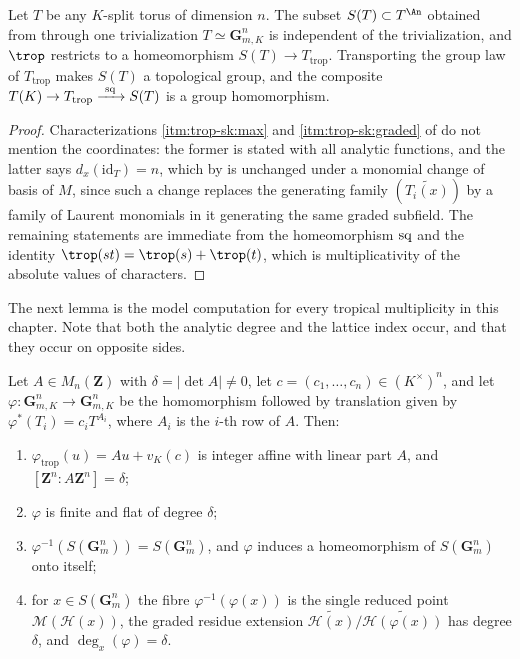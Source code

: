 \begin{corollary}
\label{cor:trop-skeleton-intrinsic}
Let $T$ be any $K$-split torus of dimension $n$. The subset
$S(T)\subset T^{\An}$ obtained from  through
one trivialization $T\simeq\mathbf G_{m,K}^n$ is independent of the
trivialization, and $\trop$ restricts to a homeomorphism
$S(T)\to T_{\mathrm{trop}}$. Transporting the group law of
$T_{\mathrm{trop}}$ makes $S(T)$ a topological group, and the composite
$T(K)\to T_{\mathrm{trop}}\xrightarrow{\ \sq\ }S(T)$ is a group
homomorphism.
\end{corollary}

\begin{proof}
Characterizations \cref{itm:trop-sk:max} and \cref{itm:trop-sk:graded} of
 do not mention the coordinates: the former
is stated with all analytic functions, and the latter says
$d_x(\mathrm{id}_T)=n$, which by
 is unchanged under a monomial change
of basis of $M$, since such a change replaces the generating family
$(\widetilde{T_i(x)})$ by a family of Laurent monomials in it generating the
same graded subfield. The remaining statements are immediate from the
homeomorphism $\operatorname{sq}$ and the identity $\trop(st)=\trop(s)+\trop(t)$, which is
multiplicativity of the absolute values of characters.
\end{proof}

The next lemma is the model computation for every tropical multiplicity in
this chapter. Note that both the analytic degree and the lattice index occur,
and that they occur on opposite sides.

\begin{lemma}
\label{lem:trop-monomial-degree}
Let $A\in M_n(\mathbf Z)$ with $\delta=|\det A|\ne0$, let
$c=(c_1,\ldots,c_n)\in(K^\times)^n$, and let
$\varphi:\mathbf G_{m,K}^n\to\mathbf G_{m,K}^n$ be the homomorphism
followed by translation given by $\varphi^*(T_i)=c_iT^{A_i}$, where $A_i$
is the $i$-th row of $A$. Then:
\begin{enumerate}
\item\label{itm:trop-mono:affine} $\varphi_{\mathrm{trop}}(u)=Au+v_K(c)$ is
  integer affine with linear part $A$, and
  $[\mathbf Z^n:A\mathbf Z^n]=\delta$;
\item\label{itm:trop-mono:finflat} $\varphi$ is finite and flat of degree
  $\delta$;
\item\label{itm:trop-mono:preimage}
  $\varphi^{-1}(S(\mathbf G_m^n))=S(\mathbf G_m^n)$, and $\varphi$ induces a
  homeomorphism of $S(\mathbf G_m^n)$ onto itself;
\item\label{itm:trop-mono:degree} for $x\in S(\mathbf G_m^n)$ the fibre
  $\varphi^{-1}(\varphi(x))$ is the single reduced point
  $\mathcal M(\mathcal H(x))$, the graded residue extension
  $\widetilde{\mathcal H(x)}/\widetilde{\mathcal H(\varphi(x))}$ has degree
  $\delta$, and $\deg_x(\varphi)=\delta$.
\end{enumerate}
\end{lemma}

